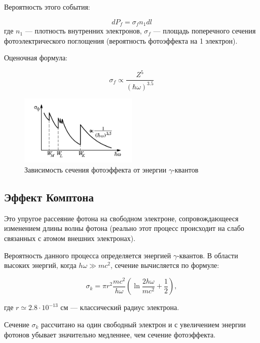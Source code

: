 \documentclass[a4paper, 12pt]{article}
\begin{document}
            Вероятность этого события:

            $$
            dP_f = \sigma_f n_1 dl
            $$
            где $n_1$ --- плотность внутренних электронов, $\sigma_f$ --- площадь поперечного сечения фотоэлектрического поглощения (вероятность фотоэффекта на 1 электрон).

            Оценочная формула:

            $$
            \sigma_f \propto \frac{Z^5}{(\hbar \omega)^{3.5}}
            $$

            \begin{figure}[ht!]
                \begin{center}
                    \includegraphics[width = 0.5\textwidth]{img/photo_effect.png}
                    \caption{Зависимость сечения фотоэффекта от энергии $\gamma$-квантов}
                    \label{photo_effect}
                \end{center}
            \end{figure}

        \subsection{Эффект Комптона}

            Это упругое рассеяние фотона на свободном электроне, сопровождающееся изменением длины волны фотона (реально этот процесс происходит на слабо связанных с атомом внешних электронах).

            Вероятность данного процесса определяется энергией $\gamma$-квантов. В области высоких энергий, когда $h\omega \gg mc^2$, сечение вычисляется по формуле:

            $$
            \sigma_k = \pi r^2 \frac{mc^2}{h\omega} \left( \ln \frac{2h\omega}{mc^2} + \frac{1}{2} \right),
            $$

            где $r \simeq 2.8 \cdot 10^{-13}$ см — классический радиус электрона.

            Сечение $\sigma_k$ рассчитано на один свободный электрон и с увеличением энергии фотонов убывает значительно медленнее, чем сечение фотоэффекта.
\end{document}
